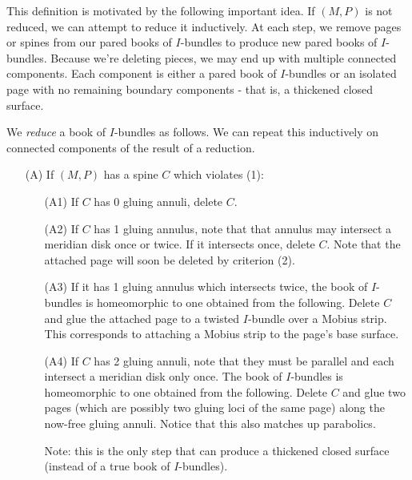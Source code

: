 This definition is motivated by the following important idea. If $(M,P)$ is not
reduced, we can attempt to reduce it inductively. At each step, we remove pages
or spines from our pared books of $I$-bundles to produce new pared books of
$I$-bundles.  Because we're deleting pieces, we may end up with multiple
connected components. Each component is either a pared book of $I$-bundles or
an isolated page with no remaining boundary components - that is, a thickened
closed surface.

\begin{defn}

We \emph{reduce} a book of $I$-bundles as follows. We can repeat this
inductively on connected components of the result of a reduction.

\begin{enumerate}

\item[(A)] If $(M,P)$ has a spine $C$ which violates (1):

\begin{enumerate}

\item[(A1)] If $C$ has 0 gluing annuli, delete $C$.

\item[(A2)] If $C$ has 1 gluing annulus, note that that annulus may intersect
a meridian disk once or twice. If it intersects once, delete $C$. Note that the
attached page will soon be deleted by criterion (2).

\item[(A3)] If it has 1 gluing annulus which intersects twice, the book of
$I$-bundles is homeomorphic to one obtained from the following.  Delete $C$ and
glue the attached page to a twisted $I$-bundle over a Mobius strip. This
corresponds to attaching a Mobius strip to the page's base surface.

\item[(A4)] If $C$ has 2 gluing annuli, note that they must be parallel and
each intersect a meridian disk only once. The book of $I$-bundles is
homeomorphic to one obtained from the following. Delete $C$ and glue two pages
(which are possibly two gluing loci of the same page) along the now-free gluing
annuli.  Notice that this also matches up parabolics.

Note: this is the only step that can produce a thickened closed surface
(instead of a true book of $I$-bundles).

\end{enumerate}


\end{enumerate}
\end{defn}
